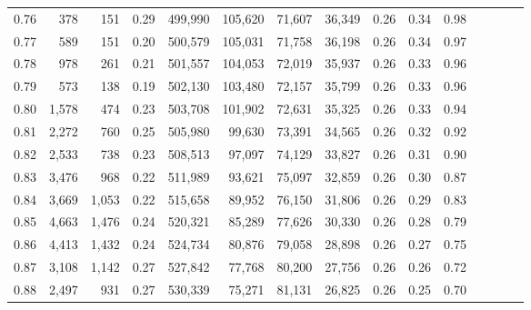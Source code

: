\begin{tabular}{rrrcrrrrrrrrrrr}
0.76 &     378 &     151 &                                       0.29 &  499,990 &  105,620 &   71,607 &   36,349 &  0.26 &  0.34 &                         0.98 \\
0.77 &     589 &     151 &                                       0.20 &  500,579 &  105,031 &   71,758 &   36,198 &  0.26 &  0.34 &                         0.97 \\
0.78 &     978 &     261 &                                       0.21 &  501,557 &  104,053 &   72,019 &   35,937 &  0.26 &  0.33 &                         0.96 \\
0.79 &     573 &     138 &                                       0.19 &  502,130 &  103,480 &   72,157 &   35,799 &  0.26 &  0.33 &                         0.96 \\
0.80 &   1,578 &     474 &                                       0.23 &  503,708 &  101,902 &   72,631 &   35,325 &  0.26 &  0.33 &                         0.94 \\
0.81 &   2,272 &     760 &                                       0.25 &  505,980 &   99,630 &   73,391 &   34,565 &  0.26 &  0.32 &                         0.92 \\
0.82 &   2,533 &     738 &                                       0.23 &  508,513 &   97,097 &   74,129 &   33,827 &  0.26 &  0.31 &                         0.90 \\
0.83 &   3,476 &     968 &                                       0.22 &  511,989 &   93,621 &   75,097 &   32,859 &  0.26 &  0.30 &                         0.87 \\
0.84 &   3,669 &   1,053 &                                       0.22 &  515,658 &   89,952 &   76,150 &   31,806 &  0.26 &  0.29 &                         0.83 \\
0.85 &   4,663 &   1,476 &                                       0.24 &  520,321 &   85,289 &   77,626 &   30,330 &  0.26 &  0.28 &                         0.79 \\
0.86 &   4,413 &   1,432 &                                       0.24 &  524,734 &   80,876 &   79,058 &   28,898 &  0.26 &  0.27 &                         0.75 \\
0.87 &   3,108 &   1,142 &                                       0.27 &  527,842 &   77,768 &   80,200 &   27,756 &  0.26 &  0.26 &                         0.72 \\
0.88 &   2,497 &     931 &                                       0.27 &  530,339 &   75,271 &   81,131 &   26,825 &  0.26 &  0.25 &                         0.70 \\

\end{tabular}
